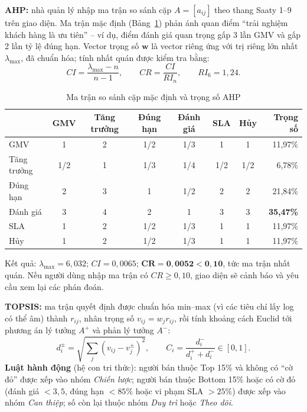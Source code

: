 \documentclass[a4paper]{article}
\newcommand{\thead}[1]{\textbf{#1}}
\begin{document}
\textbf{AHP:} nhà quản lý nhập ma trận so sánh cặp $A = [a_{ij}]$ theo thang Saaty 1--9 trên giao diện. Ma trận mặc định (Bảng~\ref{tab:ahp}) phản ánh quan điểm ``trải nghiệm khách hàng là ưu tiên'' -- ví dụ, điểm đánh giá quan trọng gấp 3 lần GMV và gấp 2 lần tỷ lệ đúng hạn. Vector trọng số $\mathbf{w}$ là vector riêng ứng với trị riêng lớn nhất $\lambda_{\max}$, đã chuẩn hóa; tính nhất quán được kiểm tra bằng:
\begin{equation}
CI = \frac{\lambda_{\max} - n}{n - 1}, \qquad CR = \frac{CI}{RI_n}, \qquad RI_6 = 1{,}24 .
\end{equation}

\begin{table}[!htbp]
\centering
\caption{Ma trận so sánh cặp mặc định và trọng số AHP}
\label{tab:ahp}
\small
\begin{tabular}{@{}l c c c c c c r@{}}
\toprule
 & \thead{GMV} & \thead{Tăng trưởng} & \thead{Đúng hạn} & \thead{Đánh giá} & \thead{SLA} & \thead{Hủy} & \thead{Trọng số} \\
\midrule
GMV & 1 & 2 & 1/2 & 1/3 & 1 & 1 & 11,97\% \\
Tăng trưởng & 1/2 & 1 & 1/3 & 1/4 & 1/2 & 1/2 & 6,78\% \\
Đúng hạn & 2 & 3 & 1 & 1/2 & 2 & 2 & 21,84\% \\
Đánh giá & 3 & 4 & 2 & 1 & 3 & 3 & \textbf{35,47\%} \\
SLA & 1 & 2 & 1/2 & 1/3 & 1 & 1 & 11,97\% \\
Hủy & 1 & 2 & 1/2 & 1/3 & 1 & 1 & 11,97\% \\
\bottomrule
\end{tabular}
\end{table}
Kết quả: $\lambda_{\max} = 6{,}032$; $CI = 0{,}0065$; $\mathbf{CR = 0{,}0052 < 0{,}10}$, tức ma trận nhất quán. Nếu người dùng nhập ma trận có $CR \ge 0{,}10$, giao diện sẽ cảnh báo và yêu cầu xem lại các phán đoán.

\textbf{TOPSIS:} ma trận quyết định được chuẩn hóa min--max (vì các tiêu chí lấy log có thể âm) thành $r_{ij}$, nhân trọng số $v_{ij} = w_j r_{ij}$, rồi tính khoảng cách Euclid tới phương án lý tưởng $A^+$ và phản lý tưởng $A^-$:
\begin{equation}
d_i^{\pm} = \sqrt{\sum_j \left(v_{ij} - v_j^{\pm}\right)^2}, \qquad C_i = \frac{d_i^-}{d_i^+ + d_i^-} \in [0, 1].
\end{equation}
\textbf{Luật hành động} (hệ con tri thức): người bán thuộc Top 15\% và không có ``cờ đỏ'' được xếp vào nhóm \textit{Chiến lược}; người bán thuộc Bottom 15\% hoặc có cờ đỏ (đánh giá $< 3{,}5$, đúng hạn $< 85\%$ hoặc vi phạm SLA $> 25\%$) được xếp vào nhóm \textit{Can thiệp}; số còn lại thuộc nhóm \textit{Duy trì} hoặc \textit{Theo dõi}.
\end{document}
